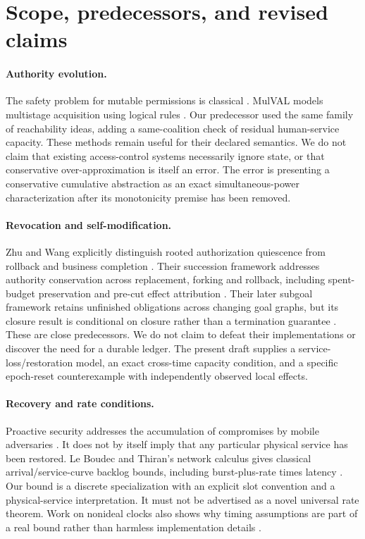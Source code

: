 \documentclass[11pt,a4paper]{article}
\theoremstyle{definition}\newtheorem{definition}{Definition}
\begin{document}
\section{Scope, predecessors, and revised claims}
\label{sec:related}
\paragraph{Authority evolution.}
The safety problem for mutable permissions is classical \cite{hru}. MulVAL models multistage acquisition using logical rules \cite{mulval}. Our predecessor used the same family of reachability ideas, adding a same-coalition check of residual human-service capacity. These methods remain useful for their declared semantics. We do not claim that existing access-control systems necessarily ignore state, or that conservative over-approximation is itself an error. The error is presenting a conservative cumulative abstraction as an exact simultaneous-power characterization after its monotonicity premise has been removed.

\paragraph{Revocation and self-modification.}
Zhu and Wang explicitly distinguish rooted authorization quiescence from rollback and business completion \cite{quiescence}. Their succession framework addresses authority conservation across replacement, forking and rollback, including spent-budget preservation and pre-cut effect attribution \cite{succession}. Their later subgoal framework retains unfinished obligations across changing goal graphs, but its closure result is conditional on closure rather than a termination guarantee \cite{subgoals}. These are close predecessors. We do not claim to defeat their implementations or discover the need for a durable ledger. The present draft supplies a service-loss/restoration model, an exact cross-time capacity condition, and a specific epoch-reset counterexample with independently observed local effects.

\paragraph{Recovery and rate conditions.}
Proactive security addresses the accumulation of compromises by mobile adversaries \cite{proactive}. It does not by itself imply that any particular physical service has been restored. Le Boudec and Thiran's network calculus gives classical arrival/service-curve backlog bounds, including burst-plus-rate times latency \cite{netcal}. Our bound is a discrete specialization with an explicit slot convention and a physical-service interpretation. It must not be advertised as a novel universal rate theorem. Work on nonideal clocks also shows why timing assumptions are part of a real bound rather than harmless implementation details \cite{clocks}.
\end{document}
